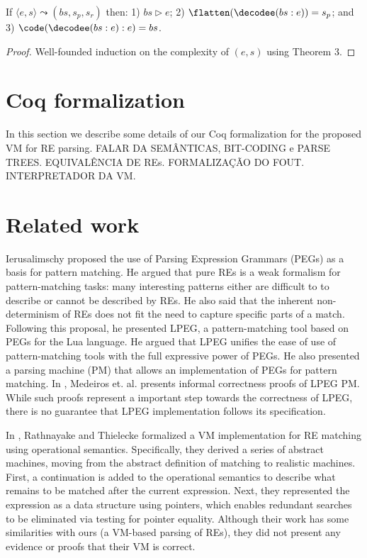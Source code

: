 \begin{Theorem}
  If $\langle e, s \rangle \leadsto (bs,s_p,s_r)$ then: 1) $bs \rhd e$; 2) $\flatten(\decodee(bs : e)) = s_p$; and 3)
  $\code(\decodee(bs : e) : e) = bs$. 
\end{Theorem}
\begin{proof}
  Well-founded induction on the complexity of $(e,s)$ using Theorem 3.
\end{proof}



\section{Coq formalization}


\label{section:formalization}


In this section we describe some details of our Coq formalization for the proposed VM for RE parsing.
FALAR DA SEMÂNTICAS, BIT-CODING e PARSE TREES. EQUIVALÊNCIA DE REs. FORMALIZAÇÃO DO FOUT. INTERPRETADOR
DA VM.


\section{Related work}


  \label{section:related}


Ierusalimschy \cite{Ierusalimschy2009} proposed the use of Parsing Expression Grammars (PEGs) as a basis
for pattern matching. He argued that pure REs is a weak formalism for pattern-matching tasks:
many interesting patterns either are difficult to to describe or cannot be described by REs. He also said
that the inherent non-determinism of REs does not fit the need to capture specific parts of a match. Following
this proposal, he presented LPEG, a pattern-matching tool based on PEGs for the Lua language. He
argued that LPEG unifies the ease of use of pattern-matching tools with the full expressive power of PEGs.
He also presented a parsing machine (PM) that allows an implementation of PEGs for pattern matching.
In \cite{Medeiros2008}, Medeiros et. al. presents informal correctness proofs of LPEG PM.
While such proofs represent a important step towards the correctness of LPEG, there is no guarantee that LPEG
implementation follows its specification.


In \cite{Rathnayake2011}, Rathnayake and Thielecke formalized a VM implementation for RE matching using
operational semantics. Specifically, they derived a series of abstract machines, moving from the abstract
definition of matching to realistic machines. First, a continuation is added to the operational semantics
to describe what remains to be matched after the current expression. Next, they represented the expression
as a data structure using pointers, which enables redundant searches to be eliminated via testing for pointer
equality. Although their work has some similarities with ours (a VM-based parsing of REs), they did not present
any evidence or proofs that their VM is correct.


